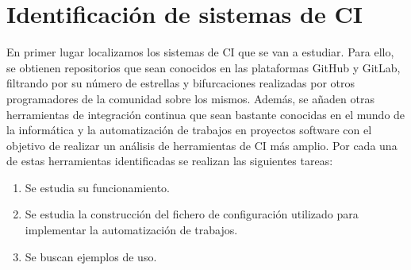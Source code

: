 \section{Identificación de sistemas de CI}
En primer lugar localizamos los sistemas de CI que se van a estudiar. Para ello, se obtienen repositorios que sean conocidos en las plataformas GitHub y GitLab, filtrando por su número de estrellas y bifurcaciones realizadas por otros programadores de la comunidad sobre los mismos. Además, se añaden otras herramientas de integración continua que sean bastante conocidas en el mundo de la informática y la automatización de trabajos en proyectos software con el objetivo de realizar un análisis de herramientas de CI más amplio.
Por cada una de estas herramientas identificadas se realizan las siguientes tareas:
\begin{enumerate}
    \item Se estudia su funcionamiento.
    \item Se estudia la construcción del fichero de configuración utilizado para implementar la automatización de trabajos.
    \item Se buscan ejemplos de uso.
\end{enumerate}

